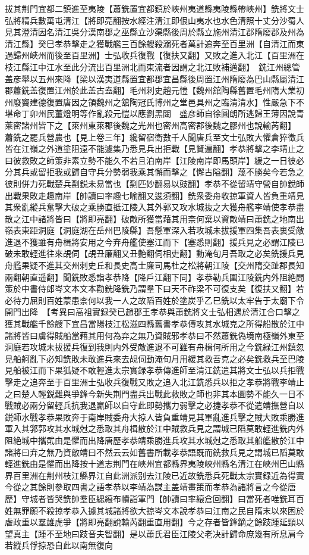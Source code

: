 拔其荆門宜都二鎮進至夷陵【蕭銑置宜都鎮於峽州夷道縣夷陵縣帶峽州】銑將文士弘將精兵數萬屯清江【將即亮翻按水經注清江即佷山夷水也水色清照十丈分沙蜀人見其澄清因名清江吳分漢南郡之巫縣立沙渠縣後周於縣立施州清江郡隋廢郡及州為清江縣】癸巳孝恭擊走之獲戰艦三百餘艘殺溺死者萬計追奔至百里洲【自清江而東過歸州峽州而後至百里洲】士弘收兵復戰【復扶又翻】又敗之進入北江【百里洲在枝江縣江中江水至此分流出百里洲北而東流者因謂之北江敗補邁翻】　銑江州總管盖彦舉以五州來降【梁以漢夷道縣置宜都郡宜昌縣後周置江州隋廢為巴山縣屬清江郡蕭銑盖復置江州於此盖古盍翻】毛州刺史趙元愷【魏州舘陶縣舊置毛州隋大業初州廢竇建德復置唐因之領魏州之舘陶冠氏博州之堂邑具州之臨清清水】性嚴急下不堪命丁卯州民董燈明等作亂殺元愷以應劉黑闥　盛彦師自徐圓朗所逃歸王薄因說青萊密諸州皆下之【萊州東萊郡後魏之光州也密州高密郡後魏之膠州也說輸芮翻】　蕭銑之罷兵營農也【見上卷三年】纔留宿衛數千人聞唐兵至文士弘敗大懼倉猝徵兵皆在江嶺之外道塗阻遠不能遽集乃悉見兵出拒戰【見賢遍翻】孝恭將擊之李靖止之曰彼救敗之師策非素立勢不能久不若且泊南岸【江陵南岸即馬頭岸】緩之一日彼必分其兵或留拒我或歸自守兵分勢弱我乘其懈而擊之【懈古隘翻】蔑不勝矣今若急之彼則併力死戰楚兵剽鋭未易當也【剽匹妙翻易以豉翻】孝恭不從留靖守營自帥銳師出戰果敗走趣南岸【帥讀曰率趣七喻翻又逡須翻】銑衆委舟收掠軍資人皆負重靖見其衆亂縱兵奮擊大破之乘勝直抵江陵入其外郭又攻水城抜之大獲舟艦李靖使孝恭盡散之江中諸將皆曰【將即亮翻】破敵所獲當藉其用柰何棄以資敵靖曰蕭銑之地南出嶺表東距洞庭【洞庭湖在岳州巴陵縣】吾懸軍深入若攻城未拔援軍四集吾表裏受敵進退不獲雖有舟楫將安用之今弃舟艦使塞江而下【塞悉則翻】援兵見之必謂江陵已破未敢輕進往來覘伺【覘丑廉翻又丑艶翻伺相吏翻】動淹旬月吾取之必矣銑援兵見舟艦果疑不進其交州刺史丘和長史高士廉司馬杜之松將朝江陵【交州隋交趾郡長知兩翻朝直遥翻】聞銑敗悉詣孝恭降【降戶江翻下同】孝恭勒兵圍江陵銑内外阻絶問策於中書侍郎岑文本文本勸銑降銑乃謂羣下曰天不祚梁不可復支矣【復扶又翻】若必待力屈則百姓蒙患柰何以我一人之故䧟百姓於塗炭乎乙巳銑以太牢告于太廟下令開門出降　【考異曰高祖實録癸已趙郡王孝恭與蕭銑將文士弘相遇於清江合口擊之獲其戰艦千餘艘下宜昌當陽枝江松滋四縣舊書孝恭傳攻其水城克之所得船散於江中諸將皆曰虜得賊船當藉其用何為弃之無乃資賊邪孝恭曰不然蕭銑偽境南極嶺外東至洞庭若攻城未拔援兵復到我則内外受敵進退不可雖有舟楫何所用之今銑緑江州鎮忽見船舸亂下必知銑敗未敢進兵來去覘伺動淹旬月用緩其救吾克之必矣銑救兵至巴陵見船被江而下果狐疑不敢輕進太宗實録孝恭傳進師至清江銑遣其將文士弘以兵拒戰擊走之追奔至于百里洲士弘收兵復戰又敗之追入北江銑悉兵以拒之孝恭將戰李靖止之曰楚人輕鋭難與爭鋒今新失荆門盡兵出戰此救敗之師也非其本圖勢不能久一日不戰賊必兩分留輕兵抗我退羸師以自守此即勢攜力弱擊之必捷孝恭不從遣靖撫營自以鋭師水戰孝恭果敗奔于南岸賊委舟大掠人皆負重靖見其軍亂進兵擊之賊大敗乘勝進軍入其郛郭攻其水城尅之悉取其舟楫散於江中賊救兵見之謂城已䧟莫敢輕進銑内外阻絶城中攜貮由是懼而出降唐歷孝恭靖乘勝進兵攻其水城尅之悉取其船艦散於江中諸將曰弃之無乃資敵靖曰不然云云如舊書所載孝恭語既而銑救兵見之謂城已䧟莫敢輕進銑由是懼而出降按十道志荆門在峽州宜都縣界夷陵峽州縣名清江在峽州巴山縣界百里洲在荆州枝江縣界江自此洲派别去江陵已近故銑悉兵死戰太宗實録近為得實今從之其餘則參取四書之語孝恭以李靖為謀主盖靖畫策而孝恭為諸將言之今從唐歷】守城者皆哭銑帥羣臣緦縗布幘詣軍門【帥讀曰率縗倉回翻】曰當死者唯銑耳百姓無罪願不殺掠孝恭入據其城諸將欲大掠岑文本說孝恭曰江南之民自隋末以來困於虐政重以羣雄虎爭【將即亮翻說輸芮翻重直用翻】今之存者皆鋒鏑之餘跂踵延頸以望真主【踵不至地曰跂音夫智翻】是以蕭氏君臣江陵父老决計歸命庶幾有所息肩今若縱兵俘掠恐自此以南無復向